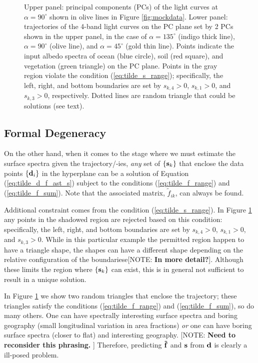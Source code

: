 \documentclass[iop,numberedappendix,apj,]{emulateapj}
\def\fast{\tilde f}
\def\memoYF#1{\color{red}[NOTE: {\bf #1}]\color{black}}
\begin{document}
\begin{figure}[t]
    \caption{Upper panel: principal components (PCs) of the light curves at $\alpha = 90^{\circ }$ shown in olive lines in Figure \ref{fig:mockdata}. Lower panel: trajectories of the 4-band light curves on the PC plane set by 2 PCs shown in the upper panel, in the case of $\alpha = 135^{\circ }$ (indigo thick line), $\alpha = 90^{\circ }$ (olive line), and $\alpha = 45^{\circ }$ (gold thin line). Points indicate the input albedo spectra of ocean (blue circle), soil (red square), and vegetation (green triangle) on the PC plane. Points in the gray region violate the condition (\ref{eq:tilde_s_range}); specifically, the left, right, and bottom boundaries are set by $s_{k,4} > 0$, $s_{k,1} > 0$, and $s_{k,3}> 0$, respectively. 
Dotted lines are random triangle that could be solutions (see text). }
    \label{fig:trajectory}
\end{figure}

\subsection{Formal Degeneracy}
\label{ss:degeneracy}

On the other hand, when it comes to the stage where we must estimate the surface spectra given the trajectory/-ies, {\it any} set of $\{ {\bf s}_k \}$ that enclose the data points $\{{\bf d}_i\}$ in the hyperplane can be a solution of Equation (\ref{eq:tilde_d_f_ast_s}) subject to the conditions (\ref{eq:tilde_f_range}) and (\ref{eq:tilde_f_sum}). 
Note that the associated matrix, $\fast _{ik}$, can always be found. 

Additional constraint comes from the condition (\ref{eq:tilde_s_range}). 
In Figure \ref{fig:trajectory} any points in the shadowed region are rejected based on this condition: specifically, the left, right, and bottom boundaries are set by $s_{k,4}> 0$, $s_{k,1}> 0$, and $s_{k,3}> 0$. 
While in this particular example the permitted region happen to have a triangle shape, the shapes can have a different shape depending on the relative configuration of the boundariese\memoYF{In more detail?}. 
Although these limits the region where $\{ {\bf s}_k \}$ can exist,   
this is in general not sufficient to result in a unique solution. 

In Figure \ref{fig:trajectory} we show two random triangles that enclose the trajectory; these triangles satisfy the conditions (\ref{eq:tilde_f_range}) and (\ref{eq:tilde_f_sum}), so do many others. 
One can have spectrally interesting surface spectra and boring geography (small longitudinal variation in area fractions) {\it or} one can have boring surface spectra (closer to flat) and interesting geography. \memoYF{Need to reconsider this phrasing. }
Therefore, predicting ${\bf \fast }$ and ${\bf s}$ from ${\bf d}$ is clearly a ill-posed problem. 
\end{document}
